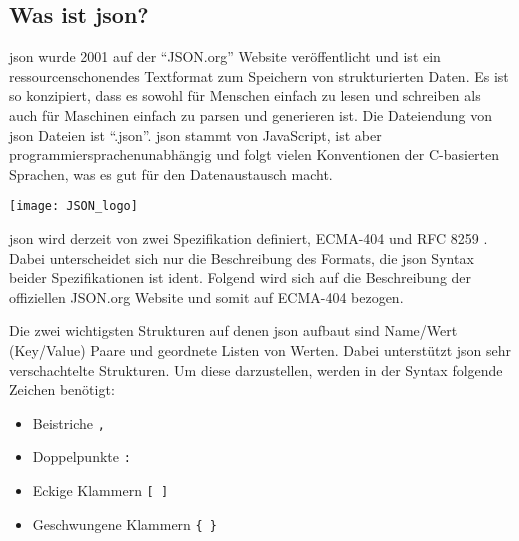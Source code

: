 \subsection{Was ist \acs{json}?}
\begin{minipage}{0.6\textwidth}
	\acf{json} wurde 2001 auf der \enquote{JSON.org} Website veröffentlicht und ist ein ressourcenschonendes Textformat zum Speichern von strukturierten Daten. Es ist so konzipiert, dass es sowohl für Menschen einfach zu lesen und schreiben als auch für Maschinen einfach zu parsen und generieren ist. Die Dateiendung von \acs{json} Dateien ist \enquote{.json}. \acs{json} stammt von JavaScript, ist aber programmiersprachenunabhängig und folgt vielen Konventionen der C-basierten Sprachen, was es gut für den Datenaustausch macht. \cite[vgl.][]{json_org:o.J., ECMA:2017}
\end{minipage}%
\hfill
\begin{minipage}{0.37\textwidth}
	\centering	
	\texttt{[image: JSON\_logo]}
\end{minipage}
\vspace{1ex}

\acs{json} wird derzeit von zwei Spezifikation definiert, ECMA-404 \cite[vgl.][]{ECMA:2017} und RFC 8259 \cite[vgl.][]{Bray:2017}. Dabei unterscheidet sich nur die Beschreibung des Formats, die \acs{json} Syntax beider Spezifikationen ist ident. Folgend wird sich auf die Beschreibung der offiziellen JSON.org Website \cite[vgl.][]{json_org:o.J.} und somit auf ECMA-404 \cite[vgl.][]{ECMA:2017} bezogen.

Die zwei wichtigsten Strukturen auf denen \acs{json} aufbaut sind Name/Wert (\engl Key/Value) Paare und geordnete Listen von Werten. Dabei unterstützt \acs{json} sehr verschachtelte Strukturen. Um diese darzustellen, werden in der Syntax folgende Zeichen benötigt:
\begin{itemize}
	 \item Beistriche \lstinline|,|
	 \item Doppelpunkte \lstinline|:|
	 \item Eckige Klammern \lstinline|[ ]|
	 \item Geschwungene Klammern \lstinline|{ }|
\end{itemize}


